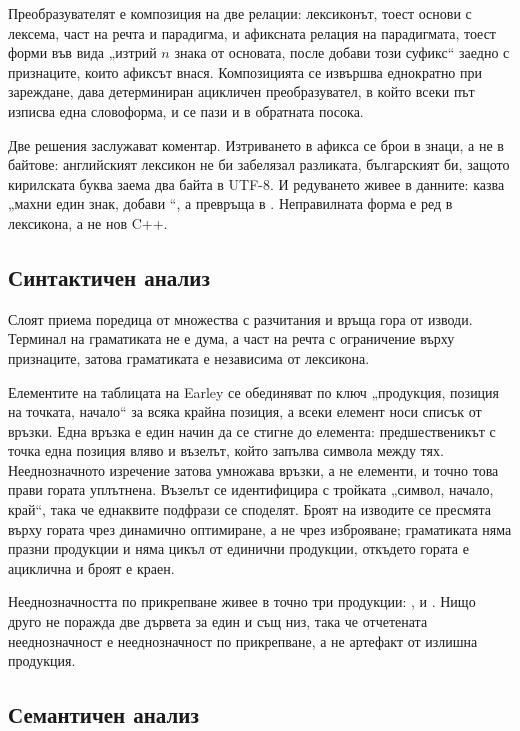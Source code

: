 Преобразувателят е композиция на две релации: лексиконът, тоест основи с лексема, част на
речта и парадигма, и афиксната релация на парадигмата, тоест форми във вида „изтрий $n$
знака от основата, после добави този суфикс“ заедно с признаците, които афиксът внася.
Композицията се извършва еднократно при зареждане, дава детерминиран ацикличен
преобразувател, в който всеки път изписва една словоформа, и се пази и в обратната посока.

Две решения заслужават коментар. Изтриването в афикса се брои в знаци, а не в байтове:
английският лексикон не би забелязал разликата, българският би, защото кирилската буква
заема два байта в UTF-8. И редуването живее в данните:  казва
„махни един знак, добави “, а  превръща
 в . Неправилната форма е ред в лексикона, а не нов C++.

\subsection{Синтактичен анализ}

Слоят приема поредица от множества с разчитания и връща гора от изводи. Терминал на
граматиката не е дума, а част на речта с ограничение върху признаците, затова граматиката
е независима от лексикона.

Елементите на таблицата на Earley се обединяват по ключ „продукция, позиция на точката,
начало“ за всяка крайна позиция, а всеки елемент носи списък от връзки. Една връзка е един
начин да се стигне до елемента: предшественикът с точка една позиция вляво и възелът, който
запълва символа между тях. Нееднозначното изречение затова умножава връзки, а не елементи,
и точно това прави гората уплътнена. Възелът се идентифицира с тройката „символ, начало,
край“, така че еднаквите подфрази се споделят. Броят на изводите се пресмята върху гората
чрез динамично оптимиране, а не чрез изброяване; граматиката няма празни продукции и няма
цикъл от единични продукции, откъдето гората е ациклична и броят е краен.

Нееднозначността по прикрепване живее в точно три продукции: ,
 и . Нищо друго не поражда две дървета за един
и същ низ, така че отчетената нееднозначност е нееднозначност по прикрепване, а не
артефакт от излишна продукция.

\subsection{Семантичен анализ}

